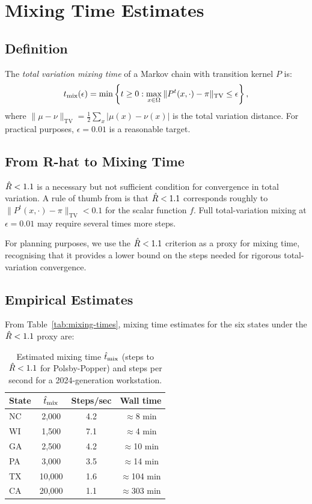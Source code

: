 \section{Mixing Time Estimates}
\label{sec:mixing-time}

\subsection{Definition}

The \emph{total variation mixing time} of a Markov chain with transition
kernel $P$ is:
\[
  t_{\mathrm{mix}}(\epsilon) = \min\left\{ t \geq 0 :
  \max_{x \in \Omega} \| P^t(x, \cdot) - \pi \|_{\mathrm{TV}} \leq \epsilon \right\},
\]
where $\|\mu - \nu\|_{\mathrm{TV}} = \frac{1}{2}\sum_x |\mu(x) - \nu(x)|$
is the total variation distance.
For practical purposes, $\epsilon = 0.01$ is a reasonable target.

\subsection{From R-hat to Mixing Time}

$\hat{R} < 1.1$ is a necessary but not sufficient condition for convergence
in total variation.
A rule of thumb from \citet{gelman2013} is that $\hat{R} < 1.1$ corresponds
roughly to $\| P^t(x, \cdot) - \pi \|_{\mathrm{TV}} < 0.1$ for the
scalar function $f$.
Full total-variation mixing at $\epsilon = 0.01$ may require several times
more steps.

For planning purposes, we use the $\hat{R} < 1.1$ criterion as a proxy for
mixing time, recognising that it provides a lower bound on the steps needed
for rigorous total-variation convergence.

\subsection{Empirical Estimates}

From Table~\ref{tab:mixing-times}, mixing time estimates for the six states
under the $\hat{R} < 1.1$ proxy are:

\begin{table}[h]
\centering
\caption{Estimated mixing time $\hat{t}_{\rm mix}$ (steps to $\hat{R} < 1.1$
         for Polsby-Popper) and steps per second for a 2024-generation
         workstation.}
\label{tab:mixing-time-est}
\begin{tabular}{lccc}
\toprule
State & $\hat{t}_{\rm mix}$ & Steps/sec & Wall time \\
\midrule
NC & 2{,}000 & 4.2 & $\approx$8 min \\
WI & 1{,}500 & 7.1 & $\approx$4 min \\
GA & 2{,}500 & 4.2 & $\approx$10 min \\
PA & 3{,}000 & 3.5 & $\approx$14 min \\
TX &10{,}000 & 1.6 & $\approx$104 min \\
CA &20{,}000 & 1.1 & $\approx$303 min \\
\bottomrule
\end{tabular}
\end{table}

